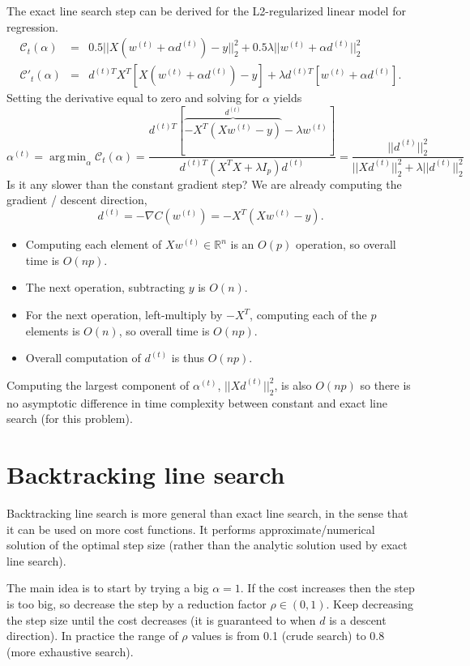 \documentclass{article}
\DeclareMathOperator*{\argmin}{arg\,min}
\begin{document}
The exact line search step can be derived for the L2-regularized
linear model for regression.
\begin{eqnarray}
  \mathcal C_t(\alpha) &=& 0.5||X(w^{(t)} + \alpha d^{(t)}) -y||_2^2 +
 0.5\lambda||w^{(t)} + \alpha d^{(t)}||_2^2\\
  \mathcal C'_t(\alpha) &=& d^{(t) T} X^T [X(w^{(t)} + \alpha d^{(t)}) -y] +
\lambda d^{(t) T} [w^{(t)} + \alpha d^{(t)}].
\end{eqnarray}
Setting the derivative equal to zero and solving for $\alpha$ yields
\begin{equation}
  \alpha^{(t)} = \argmin_\alpha \mathcal C_t(\alpha) = 
\frac{
d^{(t) T} [ \overbrace{-X^T(Xw^{(t)}-y)}^{d^{(t)}} - \lambda w^{(t)} ]
}{
d^{(t) T} (X^T X + \lambda I_p) d^{(t)}
} = \frac{
||d^{(t)}||_2^2
}{
|| X d^{(t)} ||_2^2 + 
\lambda ||d^{(t)}||_2^2
}
\end{equation}
Is it any slower than the constant gradient step? We are already computing
the gradient / descent direction,
\begin{equation}
  d^{(t)} = -\nabla C(w^{(t)}) = -X^T(X w^{(t)} - y).
\end{equation}
\begin{itemize}
\item Computing each element of $X w^{(t)}\in\mathbb R^n$ is an $O(p)$
  operation, so overall time is $O(np)$.
\item The next operation, subtracting $y$ is $O(n)$.
\item For the next operation, left-multiply by $-X^T$, computing each
  of the $p$ elements is $O(n)$, so overall time is $O(np)$.
\item Overall computation of $d^{(t)}$ is thus $O(np)$.
\end{itemize}
Computing the largest component of $\alpha^{(t)}$, $||Xd^{(t)}||_2^2$,
is also $O(np)$ so there is no asymptotic difference in time
complexity between constant and exact line search (for this problem).

\section{Backtracking line search}

Backtracking line search is more general than exact line search, in
the sense that it can be used on more cost functions. It performs
approximate/numerical solution of the optimal step size (rather than
the analytic solution used by exact line search).

The main idea is to start by trying a big $\alpha=1$. If the cost
increases then the step is too big, so decrease the step by a
reduction factor $\rho\in(0,1)$. Keep decreasing the step size until
the cost decreases (it is guaranteed to when $d$ is a descent
direction). In practice the range of $\rho$ values is from 0.1 (crude
search) to 0.8 (more exhaustive search).
\end{document}

